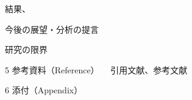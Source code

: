 \documentclass[a4j,11pt,mc]{jreport}
\begin{document}
結果、

今後の展望・分析の提言

研究の限界



5 参考資料（Reference）
 　引用文献、参考文献

6 添付（Appendix）









\newpage
\makeatletter
\renewcommand{\@biblabel}[1]{[#1]}
\makeatother



\end{document}
